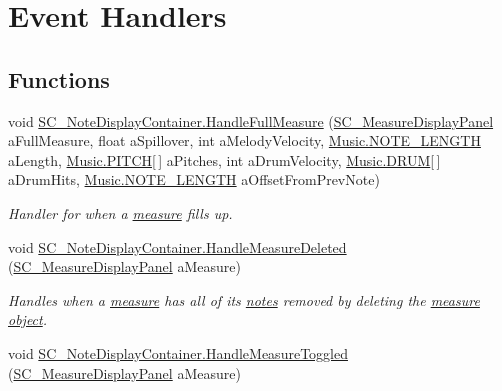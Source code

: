 \hypertarget{group___s_c___n_d_c_handlers}{}\section{Event Handlers}
\label{group___s_c___n_d_c_handlers}
\subsection*{Functions}
\begin{DoxyCompactItemize}
\item 
void \hyperlink{group___s_c___n_d_c_handlers_ga40c5a3b59608c559ab96ad0338c5e042}{S\+C\+\_\+\+Note\+Display\+Container.\+Handle\+Full\+Measure} (\hyperlink{class_s_c___measure_display_panel}{S\+C\+\_\+\+Measure\+Display\+Panel} a\+Full\+Measure, float a\+Spillover, int a\+Melody\+Velocity, \hyperlink{group___music_enums_gaf11b5f079adbb21c800b9eca1c5c3cbd}{Music.\+N\+O\+T\+E\+\_\+\+L\+E\+N\+G\+TH} a\+Length, \hyperlink{group___music_enums_ga508f69b199ea518f935486c990edac1d}{Music.\+P\+I\+T\+CH}\mbox{[}$\,$\mbox{]} a\+Pitches, int a\+Drum\+Velocity, \hyperlink{group___music_enums_gade475b4382c7066d1af13e7c13c029b6}{Music.\+D\+R\+UM}\mbox{[}$\,$\mbox{]} a\+Drum\+Hits, \hyperlink{group___music_enums_gaf11b5f079adbb21c800b9eca1c5c3cbd}{Music.\+N\+O\+T\+E\+\_\+\+L\+E\+N\+G\+TH} a\+Offset\+From\+Prev\+Note)
\begin{DoxyCompactList}\small\item\em Handler for when a \hyperlink{group___doc_s_c___m_d_p}{measure} fills up. \end{DoxyCompactList}\item 
void \hyperlink{group___s_c___n_d_c_handlers_ga40ffb2c779af43930924348c265c9e09}{S\+C\+\_\+\+Note\+Display\+Container.\+Handle\+Measure\+Deleted} (\hyperlink{class_s_c___measure_display_panel}{S\+C\+\_\+\+Measure\+Display\+Panel} a\+Measure)
\begin{DoxyCompactList}\small\item\em Handles when a \hyperlink{group___doc_s_c___m_d_p}{measure} has all of its \hyperlink{group___music_structs_struct_music_1_1_combined_note}{notes} removed by deleting the \hyperlink{group___doc_s_c___m_d_p}{measure object}. \end{DoxyCompactList}\item 
void \hyperlink{group___s_c___n_d_c_handlers_ga458d57203645be514d3626211044b584}{S\+C\+\_\+\+Note\+Display\+Container.\+Handle\+Measure\+Toggled} (\hyperlink{class_s_c___measure_display_panel}{S\+C\+\_\+\+Measure\+Display\+Panel} a\+Measure)

\end{DoxyCompactItemize}
